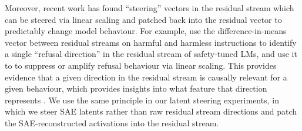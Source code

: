 Moreover, recent work has found ``steering'' vectors in the residual stream which can be steered via linear scaling and patched back into the residual vector to predictably change model behaviour. For example,
\citet{arditi2024refusal} use the difference-in-means vector between residual streams on harmful and harmless instructions to identify a single ``refusal direction'' in the residual stream of safety-tuned LMs, and use it to to suppress or amplify refusal behaviour via linear scaling.
This provides evidence that a given direction in the residual stream is causally relevant for a given behaviour, which provides insights into what feature that direction represents \cite{ferrando2024primer}.
We use the same principle in our latent steering experiments, in which we steer SAE latents rather than raw residual stream directions and patch the SAE-reconstructed activations into the residual stream.





